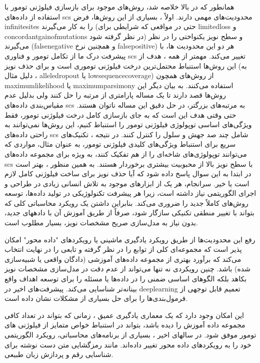 همانطور که در بالا خلاصه شد، روش‌های موجود برای بازسازی فیلوژنی تومور با استفاده از داده‌های \gls{scs} محدودیت‌های مهمی دارند. اولاً ، بسیاری از این روش‌ها، فرض \gls{infinitesites} را به کار می‌گیرند (حتی در مواقعی که شرایطی برای \gls{limitedloss} و \gls{concordantgainofmutations}  در نظر گرفته شود) و سطح نویز یکنواختی را در نظر می‌گیرند (\gls{falsenegative} و همچنین نرخ \gls{falsepositive})  هر دو این محدودیت ها، با پیشرفت درک ما از تکامل تومور و فناوری \gls{scs}  تغییر می‌کند. مهمتر از همه ، هدف از این روش‌ها استنباط محتمل‌ترین درخت فیلوژنی توموری است و برای حذف نویز (به دلیل مثال ، \gls{alleledropout} یا \gls{lowsequencecoverage}) از روش‌های همچون \gls{maximumlikelihood} یا \gls{maximumparsimony} استفاده می‌کنند. به بیان دیگر این روش‌ها قصد دارند تا یک مساله پارامتری از مرتبه  را حل کنند ولی بدلیل  عدم مقیاس‌بندی داده‌های \gls{scs} به مرتبه‌های بزرگتر، در حل دقیق این مساله ناتوان هستند. حتی وقتی هدف این است که به جای بازسازی کامل درخت فیلوژنی تومور، فقط ویژگی‌های اساسی توپولوژی فیلوژنی تومور را استنباط کنیم، این روش‌ها نمی‌توانند به راحتی داده‌های \gls{scs} شامل چند صد جهش و سلول را کنترل کنند. در نتیجه ، تکنیک‌های سریع برای استنباط ویژگی‌های کلیدی فیلوژنی تومور، به عنوان مثال، مواردی که می‌توانند توپولوژی‌های شاخه‌ای را از هم تفکیک کنند، به ویژه برای مجموعه داده‌های \gls{scs} با سطح نویز بالا از محبوبیت بیشتری برخوردار هستند. به همین منظور ، بهتر است در ابتدا به این سوال پاسخ داده شود که آیا حذف نویز  برای ساخت فیلوژنی کامل لازم است یا خیر. سرانجام، هر یک از ابزارهای موجود به تلاش انسانی زیادی در طراحی و اجرای الگوریتمی نیاز داشته است، زیرا هر پیشرفت تکنولوژیکی در تولید داده‌ها، توسعه روش‌های کاملاً جدید را ضروری می‌کند. بنابراین داشتن یک رویکرد محاسباتی کلی که بتواند با تغییر منطقی تکنیکی سازگار شود، صرفاً از طریق آموزش آن با دادههای جدید، بدون نیاز به مدل‌سازی صریح مشخصات نویز، بسیار مطلوب است.


رفع این محدودیت‌ها از طریق رویکرد یادگیری ماشینی یا رویکردهای "داده محور" امکان پذیر است که مجموعه‌ای کلی از توابع را در نظر گرفته و تابعی را در نهایت انتخاب می‌کند که برآورد بهتری از مجموعه داده‌های آموزشی (دادگان واقعی یا شبیه‌سازی شده) باشد. چنین رویکردی نه تنها می‌تواند از عدم دقت در مدل‌سازی مشخصات نویز بکاهد بلکه الگوهای اساسی ضمنی را در داده‌ها یا مسئله را برای توسعه اهداف واقع بینانه‌تر شناسایی می‌کند. پیشرفت‌های اخیر در \gls{deeplearning} تعمیم قابل توجهی از فرمول‌بندی‌ها را برای حل بسیاری از مشکلات نشان داده است. \cite{silver2017mastering, devlin2018bert, liu2019roberta}



این امکان وجود دارد که یک معماری یادگیری عمیق ، زمانی که بتواند در تعداد کافی مجموعه داده آموزش را دیده باشد، بتواند در استنباط خواص متمایز از فیلوژنی های تومور موفق شود.  در سالهای اخیر ، بسیاری از برنامه‌های محاسباتی، رویکرد الگوریتمی خود را به رویکردهای داده محور تغییر داده‌اند. مانند رمزگشایی متن دست نوشته برای شناسایی رقم \cite{ciregan2012multi} و پردازش زبان طبیعی. \cite{devlin2018bert}


